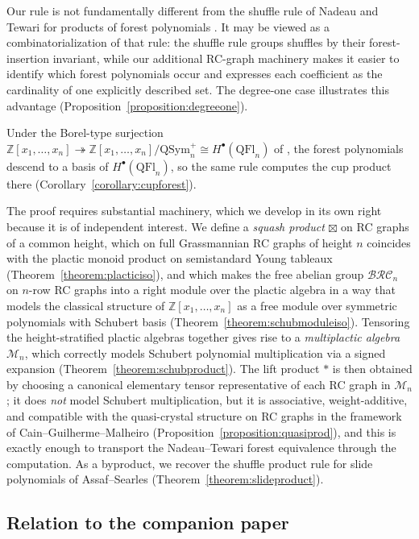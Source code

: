 \documentclass[pdflatex,sn-mathphys-num]{sn-jnl}
\numberwithin{equation}{subsection}
\newcommand{\BRC}{\mathcal{BRC}}
\theoremstyle{thmstyleone}
\theoremstyle{thmstylethree}
\theoremstyle{thmstyletwo}
\begin{document}
Our rule is not fundamentally different from the shuffle rule of Nadeau and Tewari for products of forest polynomials \cite[\S6]{nadeau2024forest}. It may be viewed as a combinatorialization of that rule: the shuffle rule groups shuffles by their forest-insertion invariant, while our additional RC-graph machinery makes it easier to identify which forest polynomials occur and expresses each coefficient as the cardinality of one explicitly described set. The degree-one case illustrates this advantage (Proposition~\ref{proposition:degreeone}).

Under the Borel-type surjection $\mathbb{Z}[x_1,\ldots,x_n]\twoheadrightarrow \mathbb{Z}[x_1,\ldots,x_n]/\mathrm{QSym}_n^+\cong H^\bullet(\mathrm{QFl}_n)$ of \cite{bergeron2025qsymflag}, the forest polynomials descend to a basis of $H^\bullet(\mathrm{QFl}_n)$, so the same rule computes the cup product there (Corollary~\ref{corollary:cupforest}).

The proof requires substantial machinery, which we develop in its own right because it is of independent interest. We define a \emph{squash product} $\boxtimes$ on RC graphs of a common height, which on full Grassmannian RC graphs of height $n$ coincides with the plactic monoid product on semistandard Young tableaux (Theorem~\ref{theorem:placticiso}), and which makes the free abelian group $\BRC_n$ on $n$-row RC graphs into a right module over the plactic algebra in a way that models the classical structure of $\mathbb{Z}[x_1,\ldots,x_n]$ as a free module over symmetric polynomials with Schubert basis (Theorem~\ref{theorem:schubmoduleiso}). Tensoring the height-stratified plactic algebras together gives rise to a \emph{multiplactic algebra} $\mathcal{M}_n$, which correctly models Schubert polynomial multiplication via a signed expansion (Theorem~\ref{theorem:schubproduct}). The lift product $*$ is then obtained by choosing a canonical elementary tensor representative of each RC graph in $\mathcal{M}_n$; it does \emph{not} model Schubert multiplication, but it is associative, weight-additive, and compatible with the quasi-crystal structure on RC graphs in the framework of Cain--Guilherme--Malheiro \cite{cain2023quasicrystals} (Proposition~\ref{proposition:quasiprod}), and this is exactly enough to transport the Nadeau--Tewari forest equivalence through the computation. As a byproduct, we recover the shuffle product rule for slide polynomials of Assaf--Searles \cite{assaf2017slide} (Theorem~\ref{theorem:slideproduct}).

\subsection*{Relation to the companion paper}
\end{document}
